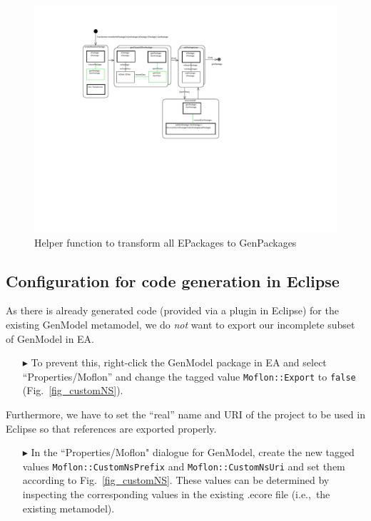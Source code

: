 \begin{figure}[htbp]
\begin{center}  
\includegraphics[width=1.0\textwidth]{pics/Ecore2GenModel/SDMtransformEpackageToGenPackage}
\caption{Helper function to transform all \textsf{EPackages} to \textsf{GenPackages}}  
\label{fig_transf}
\end{center}
\end{figure} 


\subsection{Configuration for code generation in Eclipse}
\label{sec:Project Combination}

As there is already generated code (provided via a plugin in Eclipse) for the existing \textsf{GenModel} metamodel, we do \emph{not} want to export our incomplete subset of \textsf{GenModel} in EA. 
\begin{enumerate}
\item[$\blacktriangleright$] To prevent this, right-click the \textsf{GenModel} package in EA and select ``Properties/Moflon'' and change the tagged value \texttt{Moflon::Export} to \texttt{false} (Fig.~\ref{fig_customNS}).
\end{enumerate}

Furthermore, we have to set the ``real'' name and URI of the project to be used in Eclipse so that references are exported properly. 
\begin{enumerate}
\item[$\blacktriangleright$] In the ``Properties/Moflon" dialogue for \textsf{GenModel}, create the new tagged values \texttt{Moflon::CustomNsPrefix} and \texttt{Moflon::CustomNsUri} and set them according to Fig.~\ref{fig_customNS}.
These values can be determined by inspecting the corresponding values in the existing .ecore file (i.e.,~the existing metamodel).
\end{enumerate}


